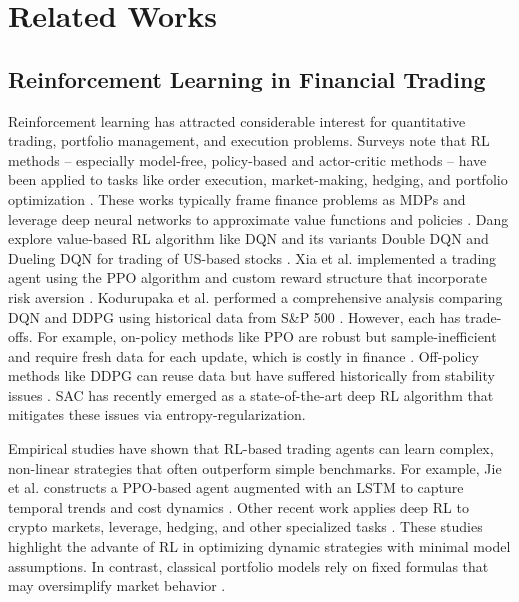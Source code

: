 \section{Related Works}
\label{sec:literature}
\subsection{Reinforcement Learning in Financial Trading}
Reinforcement learning has attracted considerable interest for quantitative trading, portfolio management, and execution problems. Surveys note that \gls{RL} methods – especially model-free, policy-based and actor-critic methods – have been applied to tasks like order execution, market-making, hedging, and portfolio optimization \cite{Hambly2023}. These works typically frame finance problems as \gls{MDP}s and leverage deep neural networks to approximate value functions and policies \cite{Kabbani2022, Xia2023, Kabbani2022}. Dang explore value-based \gls{RL} algorithm like \gls{DQN} and its variants Double \gls{DQN} and Dueling \gls{DQN} for trading of US-based stocks \cite{Dang2020}. Xia et al. implemented a trading agent using the \gls{PPO} algorithm and custom reward structure that incorporate risk aversion \cite{Xia2023}. Kodurupaka et al. performed a comprehensive analysis comparing \gls{DQN} and \gls{DDPG} using historical data from S\&P 500 \cite{Kodurupaka2024}. However, each has trade-offs. For example, on-policy methods like \gls{PPO} are robust but sample-inefficient and require fresh data for each update, which is costly in finance \cite{Haarnoja2018}. Off-policy methods like \gls{DDPG} can reuse data but have suffered historically from stability issues \cite{Haarnoja2018}. \gls{SAC} has recently emerged as a state-of-the-art deep \gls{RL} algorithm that mitigates these issues via entropy-regularization.

Empirical studies have shown that \gls{RL}-based trading agents can learn complex, non-linear strategies that often outperform simple benchmarks. For example, Jie et al. constructs a \gls{PPO}-based agent augmented with an \gls{LSTM} to capture temporal trends and cost dynamics \cite{Jie2024}. Other recent work applies deep \gls{RL} to crypto markets, leverage, hedging, and other specialized tasks \cite{Qin2024, LiuKang2024}. These studies highlight the advante of \gls{RL} in optimizing dynamic strategies with minimal model assumptions. In contrast, classical portfolio models rely on fixed formulas that may oversimplify market behavior \cite{Hambly2023}.

